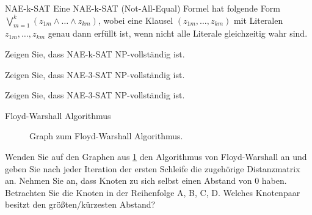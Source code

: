 \documentclass{exercisesheet}
\begin{document}
\begin{eexercises}{NAE-k-SAT}{
    Eine NAE-k-SAT (Not-All-Equal) Formel hat folgende Form $\bigvee_{m=1}^k (z_{1m} \land \ldots \land z_{km})$, wobei eine Klausel $(z_{1m}, \ldots, z_{km})$ mit Literalen $z_{1m}, \ldots, z_{km}$ genau dann erfüllt ist, wenn nicht alle Literale gleichzeitig wahr sind.
  }
  \item Zeigen Sie, dass NAE-k-SAT NP-vollständig ist.
  \item Zeigen Sie, dass NAE-3-SAT NP-vollständig ist.
  \item Zeigen Sie, dass NAE-3-SAT NP-vollständig ist.
\end{eexercises}

\begin{exercise}{Floyd-Warshall Algorithmus}
  \begin{figure}[ht]
    \centering

    \caption{Graph zum Floyd-Warshall Algorithmus.}\label{fig:floydwarshall}
  \end{figure}
  Wenden Sie auf den Graphen aus \ref{fig:floydwarshall} den Algorithmus von Floyd-Warshall an und geben Sie nach jeder Iteration der ersten Schleife die zugehörige Distanzmatrix an. Nehmen Sie an, dass Knoten zu sich selbst einen Abstand von 0 haben. Betrachten Sie die Knoten in der Reihenfolge A, B, C, D. Welches Knotenpaar besitzt den größten/kürzesten Abstand?
\end{exercise}
\end{document}

